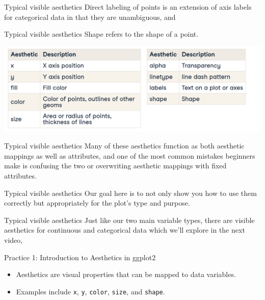 \documentclass[
  ignorenonframetext,
]{beamer}
\providecommand{\tightlist}{%
  \setlength{\itemsep}{0pt}\setlength{\parskip}{0pt}}
\begin{document}
\begin{frame}{Typical visible aesthetics}
\label{typical-visible-aesthetics-7}
Direct labeling of points is an extension of axis labels for categorical
data in that they are unambiguous, and
\end{frame}

\begin{frame}{Typical visible aesthetics}
\label{typical-visible-aesthetics-8}
Shape refers to the shape of a point.

\includegraphics{../images/im146.png}
\end{frame}

\begin{frame}{Typical visible aesthetics}
\label{typical-visible-aesthetics-9}
Many of these aesthetics function as both aesthetic mappings as well as
attributes, and one of the most common mistakes beginners make is
confusing the two or overwriting aesthetic mappings with fixed
attributes.
\end{frame}

\begin{frame}{Typical visible aesthetics}
\label{typical-visible-aesthetics-10}
Our goal here is to not only show you how to use them correctly but
appropriately for the plot's type and purpose.
\end{frame}

\begin{frame}{Typical visible aesthetics}
\label{typical-visible-aesthetics-11}
Just like our two main variable types, there are visible aesthetics for
continuous and categorical data which we'll explore in the next video,
\end{frame}

\begin{frame}[fragile]{Practice 1: Introduction to Aesthetics in
ggplot2}
\label{practice-1-introduction-to-aesthetics-in-ggplot2}
\begin{itemize}
\tightlist
\item
  Aesthetics are visual properties that can be mapped to data variables.
\item
  Examples include \texttt{x}, \texttt{y}, \texttt{color},
  \texttt{size}, and \texttt{shape}.
\end{itemize}
\end{frame}
\end{document}
